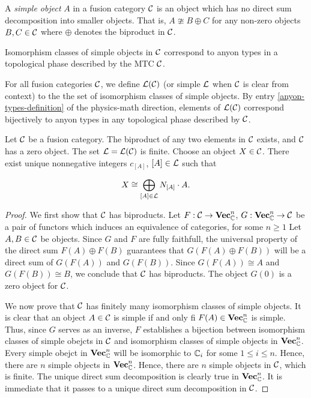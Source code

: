 \begin{defn}\label{simple-object-definition} A {\em simple object} $A$ in a fusion category ${\mathcal C}$ is an object which has no direct sum decomposition into smaller objects. That is, $A\ncong B\oplus C$ for any non-zero objects $B,C\in {\mathcal C}$ where $\oplus$ denotes the biproduct in ${\mathcal C}$.
\end{defn}

\begin{dict}\label{anyon-types-definition}
Isomorphism classes of simple objects in ${\mathcal C}$ correspond to anyon types in a topological phase described by the MTC ${\mathcal C}$.
\end{dict}

\begin{defn} For all fusion categories ${\mathcal C}$, we define ${\mathcal L}({\mathcal C})$ (or simple ${\mathcal L}$ when ${\mathcal C}$ is clear from context) to the the set of isomorphism classes of simple objects. By entry \ref{anyon-types-definition} of the physics-math direction, elements of ${\mathcal L}({\mathcal C})$ correspond bijectively to anyon types in any topological phase described by ${\mathcal C}$.
\end{defn}

\begin{prop}\label{fusion-category-simples} Let ${\mathcal C}$ be a fusion category. The biproduct of any two elements in ${\mathcal C}$ exists, and ${\mathcal C}$ has a zero object. The set ${\mathcal L}={\mathcal L}({\mathcal C})$ is finite. Choose an object $X\in {\mathcal C}$. There exist unique nonnegative integers $c_{[A]}$, $[A]\in {\mathcal L}$ such that 

$$X\cong \bigoplus_{[A]\in {\mathcal L}}N_{[A]}\cdot A.$$
\end{prop}
\begin{proof} We first show that ${\mathcal C}$ has biproducts. Let $F:{\mathcal C}\to {\bf Vec}_{{\mathbb C}}^n$, $G:{\bf Vec}_{{\mathbb C}}^n\to {\mathcal C}$ be a pair of functors which induces an equivalence of categories, for some $n\geq 1$ Let $A,B\in {\mathcal C}$ be objects. Since $G$ and $F$ are fully faithfull, the universal property of the direct sum $F(A)\oplus F(B)$ guarantees that $G(F(A)\oplus F(B))$ will be a direct sum of $G(F(A))$ and $G(F(B))$. Since $G(F(A))\cong A$ and $G(F(B))\cong B$, we conclude that ${\mathcal C}$ has biproducts. The object $G(0)$ is a zero object for ${\mathcal C}$.

We now prove that ${\mathcal C}$ has finitely many isomorphism classes of simple objects. It is clear that an object $A\in {\mathcal C}$ is simple if and only fi $F(A)\in {\bf Vec}_{{\mathbb C}}^n$ is simple. Thus, since $G$ serves as an inverse, $F$ establishes a bijection between isomorphism classes of simple obejcts in ${\mathcal C}$ and isomorphism classes of simple objects in ${\bf Vec}_{{\mathbb C}}^n$. Every simple obejct in ${\bf Vec}_{{\mathbb C}}^n$ will be isomorphic to ${\mathbb C}_i$ for some $1\leq i \leq n$. Hence, there are $n$ simple objects in ${\bf Vec}_{{\mathbb C}}^n$. Hence, there are $n$ simple objects in ${\mathcal C}$, which is finite. The unique direct sum decomposition is clearly true in ${\bf Vec}_{{\mathbb C}}^n$. It is immediate that it passes to a unique direct sum decomposition in ${\mathcal C}$.
\end{proof}

